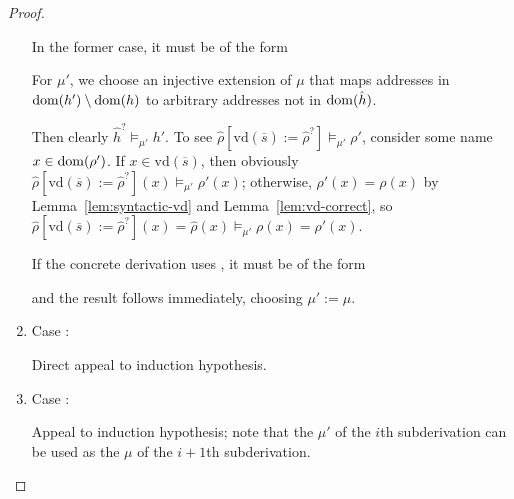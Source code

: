 \documentclass{article}
\begin{document}
\begin{proof}
\begin{enumerate}
  In the former case, it must be of the form

  \begin{prooftree}
  \end{prooftree}

  For $\mu'$, we choose an injective extension of $\mu$ that maps addresses in $\dom(h')\setminus\dom(h)$ to arbitrary addresses not in $\dom(\hat{h})$.

  Then clearly $\hat{h}^?\models_{\mu'} h'$. To see $\hat{\rho}[\mathrm{vd}(\overline{s}):=\hat{\rho}^?]\models_{\mu'}\rho'$, consider some name $x\in\dom(\rho')$. If $x\in\mathrm{vd}(\overline{s})$, then obviously $\hat{\rho}[\mathrm{vd}(\overline{s}):=\hat{\rho}^?](x)\models_{\mu'}\rho'(x)$; otherwise, $\rho'(x)=\rho(x)$ by Lemma~\ref{lem:syntactic-vd} and Lemma~\ref{lem:vd-correct}, so $\hat{\rho}[\mathrm{vd}(\overline{s}):=\hat{\rho}^?](x)=\hat{\rho}(x)\models_{\mu'}\rho(x)=\rho'(x)$.

  If the concrete derivation uses , it must be of the form

  \begin{prooftree}
  \end{prooftree}

  and the result follows immediately, choosing $\mu':=\mu$.

\item Case :

  Direct appeal to induction hypothesis.

\item Case :

  Appeal to induction hypothesis; note that the $\mu'$ of the $i$th subderivation can be used as the $\mu$ of the $i+1$th subderivation.
\end{enumerate}
\end{proof}
\end{document}
